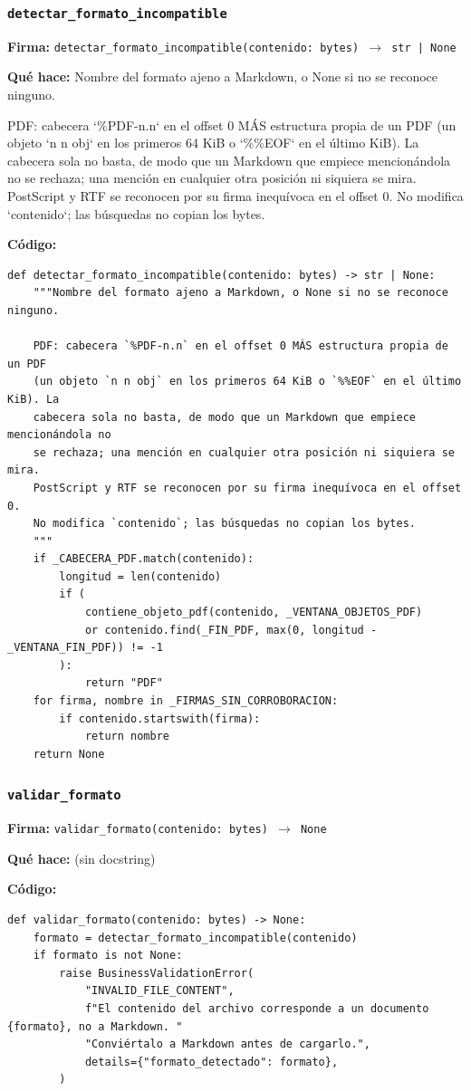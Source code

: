\documentclass[11pt,a4paper]{article}
\begin{document}
\subsubsection*{\texttt{detectar\_formato\_incompatible}}
\textbf{Firma:} \texttt{detectar\_formato\_incompatible(contenido: bytes) $\rightarrow$ str | None}

\textbf{Qué hace:} Nombre del formato ajeno a Markdown, o None si no se reconoce ninguno.

PDF: cabecera `\%PDF-n.n` en el offset 0 MÁS estructura propia de un PDF
(un objeto `n n obj` en los primeros 64 KiB o `\%\%EOF` en el último KiB). La
cabecera sola no basta, de modo que un Markdown que empiece mencionándola no
se rechaza; una mención en cualquier otra posición ni siquiera se mira.
PostScript y RTF se reconocen por su firma inequívoca en el offset 0.
No modifica `contenido`; las búsquedas no copian los bytes.

\textbf{Código:}
\begin{lstlisting}
def detectar_formato_incompatible(contenido: bytes) -> str | None:
    """Nombre del formato ajeno a Markdown, o None si no se reconoce ninguno.

    PDF: cabecera `%PDF-n.n` en el offset 0 MÁS estructura propia de un PDF
    (un objeto `n n obj` en los primeros 64 KiB o `%%EOF` en el último KiB). La
    cabecera sola no basta, de modo que un Markdown que empiece mencionándola no
    se rechaza; una mención en cualquier otra posición ni siquiera se mira.
    PostScript y RTF se reconocen por su firma inequívoca en el offset 0.
    No modifica `contenido`; las búsquedas no copian los bytes.
    """
    if _CABECERA_PDF.match(contenido):
        longitud = len(contenido)
        if (
            contiene_objeto_pdf(contenido, _VENTANA_OBJETOS_PDF)
            or contenido.find(_FIN_PDF, max(0, longitud - _VENTANA_FIN_PDF)) != -1
        ):
            return "PDF"
    for firma, nombre in _FIRMAS_SIN_CORROBORACION:
        if contenido.startswith(firma):
            return nombre
    return None
\end{lstlisting}

\subsubsection*{\texttt{validar\_formato}}
\textbf{Firma:} \texttt{validar\_formato(contenido: bytes) $\rightarrow$ None}

\textbf{Qué hace:} (sin docstring)

\textbf{Código:}
\begin{lstlisting}
def validar_formato(contenido: bytes) -> None:
    formato = detectar_formato_incompatible(contenido)
    if formato is not None:
        raise BusinessValidationError(
            "INVALID_FILE_CONTENT",
            f"El contenido del archivo corresponde a un documento {formato}, no a Markdown. "
            "Conviértalo a Markdown antes de cargarlo.",
            details={"formato_detectado": formato},
        )
\end{lstlisting}
\end{document}
